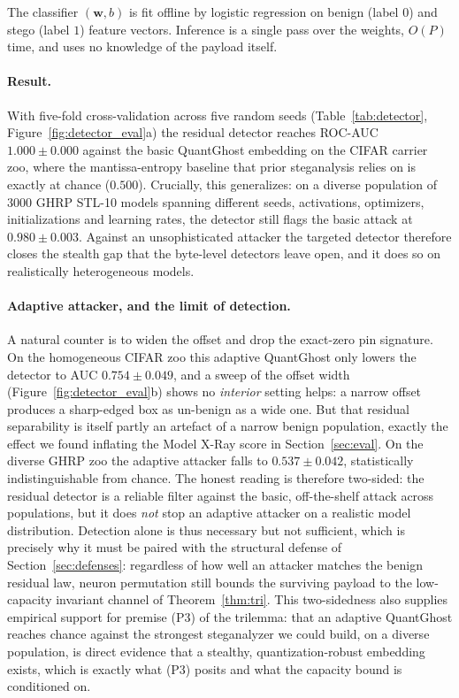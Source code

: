 \documentclass[10pt,journal]{IEEEtran}
\theoremstyle{remark}
\newcommand{\sys}{\mbox{QuantGhost}}
\begin{document}
The classifier $(\mathbf{w},b)$ is fit offline by logistic regression on benign (label $0$)
and stego (label $1$) feature vectors. Inference is a single pass over the weights, $O(P)$
time, and uses no knowledge of the payload itself.

\paragraph{Result.} With five-fold cross-validation across five random seeds
(Table~\ref{tab:detector}, Figure~\ref{fig:detector_eval}a) the residual detector reaches
ROC-AUC $1.000\pm0.000$ against the basic \sys{} embedding on the CIFAR carrier zoo, where
the mantissa-entropy baseline that prior steganalysis relies on is exactly at chance
($0.500$). Crucially, this generalizes: on a diverse population of $3000$ GHRP STL-10
models spanning different seeds, activations, optimizers, initializations and learning
rates, the detector still flags the basic attack at $0.980\pm0.003$. Against an
unsophisticated attacker the targeted detector therefore closes the stealth gap that the
byte-level detectors leave open, and it does so on realistically heterogeneous models.

\paragraph{Adaptive attacker, and the limit of detection.} A natural counter is to widen
the offset and drop the exact-zero pin signature. On the homogeneous CIFAR zoo this
adaptive \sys{} only lowers the detector to AUC $0.754\pm0.049$, and a sweep of the offset
width (Figure~\ref{fig:detector_eval}b) shows no \emph{interior} setting helps: a narrow
offset produces a sharp-edged box as un-benign as a wide one. But that residual
separability is itself partly an artefact of a narrow benign population, exactly the effect
we found inflating the Model X-Ray score in Section~\ref{sec:eval}. On the diverse GHRP
zoo the adaptive attacker falls to $0.537\pm0.042$, statistically indistinguishable from
chance. The honest reading is therefore two-sided: the residual detector is a reliable
filter against the basic, off-the-shelf attack across populations, but it does \emph{not}
stop an adaptive attacker on a realistic model distribution. Detection alone is thus
necessary but not sufficient, which is precisely why it must be paired with the structural
defense of Section~\ref{sec:defenses}: regardless of how well an attacker matches the
benign residual law, neuron permutation still bounds the surviving payload to the
low-capacity invariant channel of Theorem~\ref{thm:tri}. This two-sidedness also supplies
empirical support for premise \textup{(P3)} of the trilemma: that an adaptive \sys{} reaches
chance against the strongest steganalyzer we could build, on a diverse population, is direct
evidence that a stealthy, quantization-robust embedding exists, which is exactly what
\textup{(P3)} posits and what the capacity bound is conditioned on.
\end{document}
